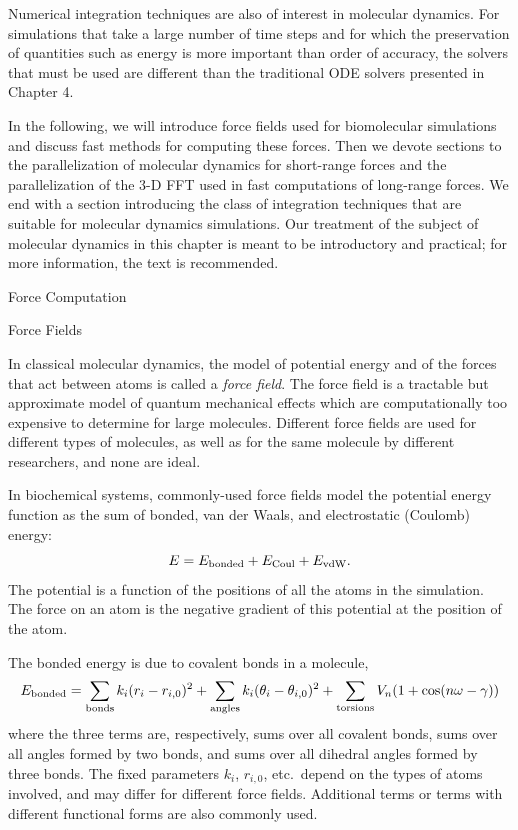 Numerical integration techniques are also of interest in molecular
dynamics.  For simulations that take a large number of time steps and
for which the preservation of quantities such as energy is more important
than order of accuracy, the solvers that must be used are different than
the traditional ODE solvers presented in Chapter 4.

In the following, we will introduce force fields used for biomolecular
simulations and discuss fast methods for computing these forces.
Then we devote sections to the parallelization of molecular dynamics for
short-range forces and the parallelization of the 3-D FFT used in fast
computations of long-range forces.  We end with a section introducing
the class of integration techniques that are suitable for molecular
dynamics simulations.  Our treatment of the subject of molecular dynamics
in this chapter is meant to be introductory and practical; for more
information, the text \cite{frenkel-smit} is recommended.


 {Force Computation}

 {Force Fields}

In classical molecular dynamics, the model of potential energy and of the
forces that act between atoms is called a {\em force field}.  The force
field is a tractable but approximate model of quantum mechanical effects
which are computationally too expensive to determine for large molecules.
Different force fields are used for different types of molecules, as well
as for the same molecule by different researchers, and none are ideal.

In biochemical systems, commonly-used force fields model the potential energy function 
as the sum of bonded, van der Waals, and electrostatic (Coulomb) energy:
\[
E = E_{\rm bonded} + E_{\rm Coul} + E_{\rm vdW}.
\]
The potential is a function of the positions of all the atoms in the simulation.
The force on an atom is the negative gradient of this potential at the 
position of the atom.  

The bonded energy is due to covalent bonds in a molecule,
\[
E_{\rm bonded} = \sum_{\rm bonds} k_i (r_i - r_{i,0})^2 + 
                 \sum_{\rm angles} k_i ( \theta_i - \theta_{i,0})^2 +
                 \sum_{\rm torsions} V_n(1+\cos(n \omega - \gamma))
\]
where the three terms are, respectively,
sums over all covalent bonds, sums over all angles formed by two bonds, and
sums over all dihedral angles formed by three bonds.  The fixed parameters 
$k_i$, $r_{i,0}$, etc.\ depend on the types of atoms involved, and
may differ for different force fields.  Additional terms or terms with
different functional forms are also commonly used.

